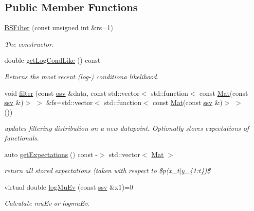 \subsection*{Public Member Functions}
\begin{DoxyCompactItemize}
\item 
\hyperlink{classBSFilter_ab1bc3d87f60ca29379cc59399d322344}{B\+S\+Filter} (const unsigned int \&rs=1)
\begin{DoxyCompactList}\small\item\em The constructor. \end{DoxyCompactList}\item 
double \hyperlink{classBSFilter_a256714635f4e153a243a5680f10b03ee}{get\+Log\+Cond\+Like} () const 
\begin{DoxyCompactList}\small\item\em Returns the most recent (log-\/) conditiona likelihood. \end{DoxyCompactList}\item 
void \hyperlink{classBSFilter_aa5d013aea8b63d672ea152852142544c}{filter} (const \hyperlink{classBSFilter_aea27600dd7c5af20fa7a0fc57f18b0a2}{osv} \&data, const std\+::vector$<$ std\+::function$<$ const \hyperlink{classBSFilter_afdce3784f96aac7305cdeeabaacdf521}{Mat}(const \hyperlink{classBSFilter_acc4caec4908ad134814082c39c3b8bef}{ssv} \&)$>$ $>$ \&fs=std\+::vector$<$ std\+::function$<$ const \hyperlink{classBSFilter_afdce3784f96aac7305cdeeabaacdf521}{Mat}(const \hyperlink{classBSFilter_acc4caec4908ad134814082c39c3b8bef}{ssv} \&)$>$ $>$())
\begin{DoxyCompactList}\small\item\em updates filtering distribution on a new datapoint. Optionally stores expectations of functionals. \end{DoxyCompactList}\item 
auto \hyperlink{classBSFilter_a848a15feab9b5b5d5eba0d986337e88a}{get\+Expectations} () const -\/$>$ std\+::vector$<$ \hyperlink{classBSFilter_afdce3784f96aac7305cdeeabaacdf521}{Mat} $>$
\begin{DoxyCompactList}\small\item\em return all stored expectations (taken with respect to \$p(x\+\_\+t$\vert$y\+\_\+\{1\+:t\})\$ \end{DoxyCompactList}\item 
virtual double \hyperlink{classBSFilter_a61098462d0a363ad8c7ee743f69c3fff}{log\+Mu\+Ev} (const \hyperlink{classBSFilter_acc4caec4908ad134814082c39c3b8bef}{ssv} \&x1)=0
\begin{DoxyCompactList}\small\item\em Calculate mu\+Ev or logmu\+Ev. \end{DoxyCompactList}\item 

\end{DoxyCompactItemize}
